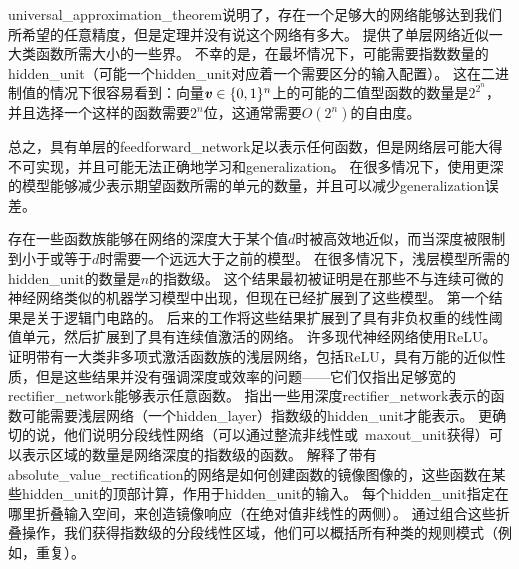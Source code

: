 \gls{universal_approximation_theorem}说明了，存在一个足够大的网络能够达到我们所希望的任意精度，但是定理并没有说这个网络有多大。
\cite{Barron93}提供了单层网络近似一大类函数所需大小的一些界。
不幸的是，在最坏情况下，可能需要指数数量的\gls{hidden_unit}（可能一个\gls{hidden_unit}对应着一个需要区分的输入配置）。
这在二进制值的情况下很容易看到：向量$\boldsymbol{\mathit{v}} \in \{0,1\}^n$上的可能的二值型函数的数量是$2^{2^n}$，并且选择一个这样的函数需要$2^n$位，这通常需要$O(2^n)$的自由度。

总之，具有单层的\gls{feedforward_network}足以表示任何函数，但是网络层可能大得不可实现，并且可能无法正确地学习和\gls{generalization}。
在很多情况下，使用更深的模型能够减少表示期望函数所需的单元的数量，并且可以减少\gls{generalization}误差。


存在一些函数族能够在网络的深度大于某个值$d$时被高效地近似，而当深度被限制到小于或等于$d$时需要一个远远大于之前的模型。
在很多情况下，浅层模型所需的\gls{hidden_unit}的数量是$n$的指数级。
这个结果最初被证明是在那些不与连续可微的神经网络类似的机器学习模型中出现，但现在已经扩展到了这些模型。
第一个结果是关于逻辑门电路的\citep{Hastad86}。
后来的工作将这些结果扩展到了具有非负权重的线性阈值单元\citep{Hastad91,Hajnal-et-al-1993}，然后扩展到了具有连续值激活的网络\citep{Maass-1992,Maass-et-al-1994}。
许多现代神经网络使用\gls{ReLU}。
\cite{Leshno-et-al-1993}证明带有一大类非多项式激活函数族的浅层网络，包括\gls{ReLU}，具有万能的近似性质，但是这些结果并没有强调深度或效率的问题——它们仅指出足够宽的\gls{rectifier_network}能够表示任意函数。
\cite{Montufar-et-al-NIPS2014}指出一些用深度\gls{rectifier_network}表示的函数可能需要浅层网络（一个\gls{hidden_layer}）指数级的\gls{hidden_unit}才能表示。
更确切的说，他们说明分段线性网络（可以通过整流非线性或~\gls{maxout_unit}获得）可以表示区域的数量是网络深度的指数级的函数。%
解释了带有\gls{absolute_value_rectification}的网络是如何创建函数的镜像图像的，这些函数在某些\gls{hidden_unit}的顶部计算，作用于\gls{hidden_unit}的输入。
每个\gls{hidden_unit}指定在哪里折叠输入空间，来创造镜像响应（在绝对值非线性的两侧）。
通过组合这些折叠操作，我们获得指数级的分段线性区域，他们可以概括所有种类的规则模式（例如，重复）。
